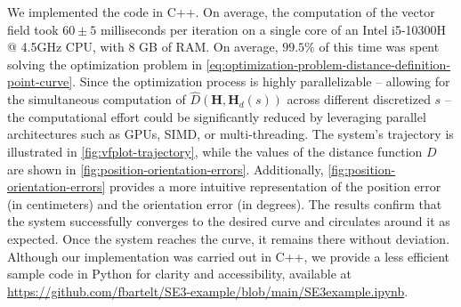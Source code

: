 We implemented the code in C++. On average, the computation of the vector field took $60\pm5$ milliseconds per iteration on a single core of an Intel i5-10300H @ 4.5GHz CPU, with 8 GB of RAM. On average, $99.5\%$ of this time was spent solving the optimization problem in \eqref{eq:optimization-problem-distance-definition-point-curve}. Since the optimization process is highly parallelizable -- allowing for the simultaneous computation of $\widehat{D}(\mathbf{H},\mathbf{H}_d(s))$ across different discretized $s$ -- the computational effort could be significantly reduced by leveraging parallel architectures such as GPUs, SIMD, or multi-threading. The system's trajectory is illustrated in \cref{fig:vfplot-trajectory}, while the values of the distance function $D$ are shown in \cref{fig:position-orientation-errors}. Additionally, \cref{fig:position-orientation-errors} provides a more intuitive representation of the position error (in centimeters) and the orientation error (in degrees). The results confirm that the system successfully converges to the desired curve and circulates around it as expected. Once the system reaches the curve, it remains there without deviation. Although our implementation was carried out in C++, we provide a less efficient sample code in Python for clarity and accessibility, available at \url{https://github.com/fbartelt/SE3-example/blob/main/SE3example.ipynb}.

